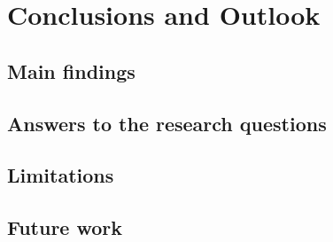 \chapter{Conclusions and Outlook}

\section{Main findings}

\section{Answers to the research questions}

\section{Limitations}

\section{Future work}
